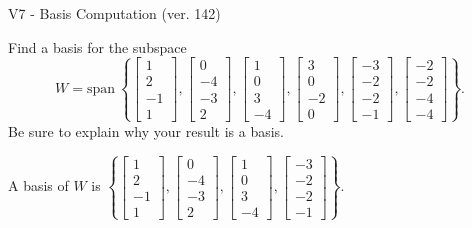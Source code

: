 \begin{exercise}
  \begin{exerciseTitle}V7 - Basis Computation (ver. 142)\end{exerciseTitle}
  \begin{exerciseStatement}
    Find a basis for the subspace 
\[W=\mathrm{span}\ \left\{\left[\begin{array}{r}
1 \\
2 \\
-1 \\
1
\end{array}\right] , \left[\begin{array}{r}
0 \\
-4 \\
-3 \\
2
\end{array}\right] , \left[\begin{array}{r}
1 \\
0 \\
3 \\
-4
\end{array}\right] , \left[\begin{array}{r}
3 \\
0 \\
-2 \\
0
\end{array}\right] , \left[\begin{array}{r}
-3 \\
-2 \\
-2 \\
-1
\end{array}\right] , \left[\begin{array}{r}
-2 \\
-2 \\
-4 \\
-4
\end{array}\right]\right\}.\]
 Be sure to explain why your result is a basis.


  \end{exerciseStatement}
  \begin{exerciseAnswer}
   A basis of \(W\) is  \(\left\{\left[\begin{array}{r}
1 \\
2 \\
-1 \\
1
\end{array}\right] , \left[\begin{array}{r}
0 \\
-4 \\
-3 \\
2
\end{array}\right] , \left[\begin{array}{r}
1 \\
0 \\
3 \\
-4
\end{array}\right] , \left[\begin{array}{r}
-3 \\
-2 \\
-2 \\
-1
\end{array}\right]\right\}\).
  


  \end{exerciseAnswer}
\end{exercise}